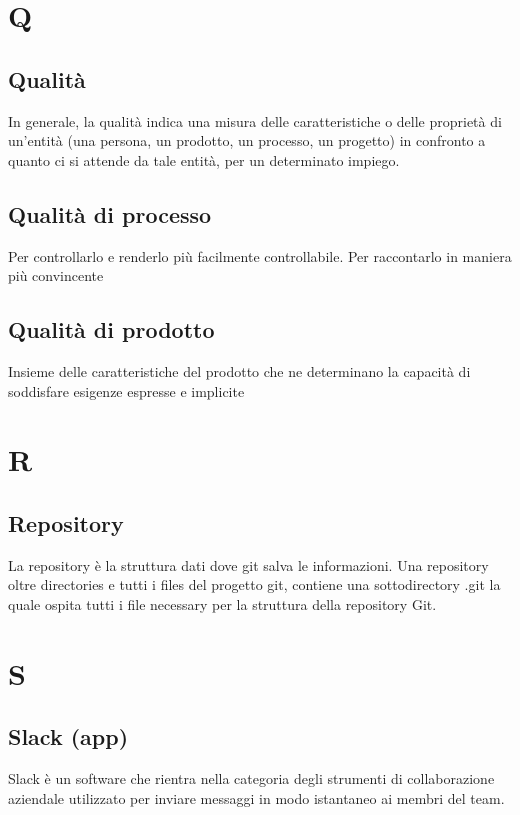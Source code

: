 	
	\section{Q}
	
	\subsection{Qualità} 
	In generale, la qualità indica una misura delle caratteristiche o delle proprietà di un’entità (una persona, un prodotto, un processo, un progetto) in confronto a quanto ci si attende da tale entità, per un determinato
impiego.
	\subsection{Qualità di processo}
Per controllarlo e renderlo più facilmente controllabile. Per raccontarlo in maniera più convincente
	\subsection{Qualità di prodotto}
	Insieme delle caratteristiche del prodotto che ne determinano la capacità di soddisfare esigenze espresse e implicite
	
	
	\section{R}

	\subsection{Repository} 
	La repository è la struttura dati dove git salva le informazioni. Una repository oltre directories e tutti i files del progetto git, contiene una sottodirectory .git la quale ospita tutti i file necessary per la struttura della repository Git.



	\section{S}
	
	\subsection{Slack (app)} 
	Slack è un software che rientra nella categoria degli strumenti di collaborazione aziendale utilizzato per inviare messaggi in modo istantaneo ai membri del team.
	
